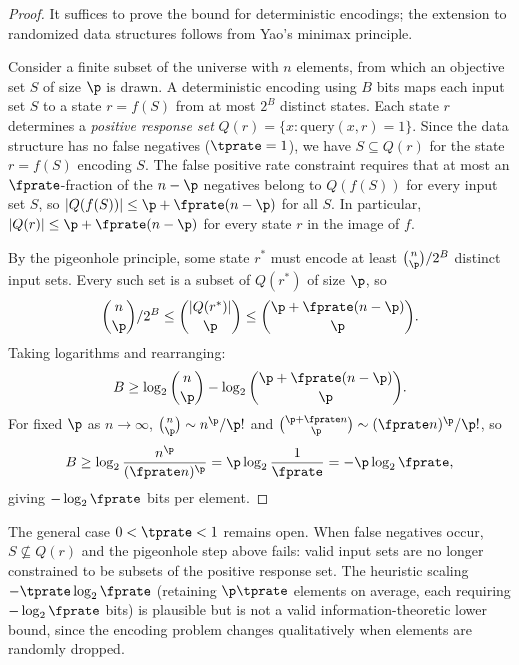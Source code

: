 \begin{proof}
It suffices to prove the bound for deterministic encodings; the extension to randomized data structures follows from Yao's minimax principle.

Consider a finite subset of the universe with $n$ elements, from which an
objective set $S$ of size $\p$ is drawn.
A deterministic encoding using $B$ bits maps each input set $S$ to a state
$r = f(S)$ from at most $2^B$ distinct states.
Each state $r$ determines a \emph{positive response set}
$Q(r) = \{x : \text{query}(x,r) = 1\}$.
Since the data structure has no false negatives ($\tprate = 1$), we have
$S \subseteq Q(r)$ for the state $r = f(S)$ encoding $S$.
The false positive rate constraint requires that at most an $\fprate$-fraction of the $n - \p$ negatives belong to $Q(f(S))$ for every input set $S$, so
$|Q(f(S))| \leq \p + \fprate(n - \p)$ for all $S$.
In particular, $|Q(r)| \leq \p + \fprate(n - \p)$ for every state $r$ in the image of $f$.

By the pigeonhole principle, some state $r^*$ must encode at least
$\binom{n}{\p} / 2^B$ distinct input sets.
Every such set is a subset of $Q(r^*)$ of size $\p$, so
\begin{equation}
\binom{n}{\p} / 2^B
    \leq \binom{|Q(r^*)|}{\p}
    \leq \binom{\p + \fprate(n - \p)}{\p}.
\end{equation}
Taking logarithms and rearranging:
\begin{equation}
B \geq \log_2 \binom{n}{\p} - \log_2 \binom{\p + \fprate(n - \p)}{\p}.
\end{equation}
For fixed $\p$ as $n \to \infty$, $\binom{n}{\p} \sim n^\p / \p!$ and
$\binom{\p + \fprate n}{\p} \sim (\fprate n)^\p / \p!$, so
\begin{equation}
B \geq \log_2 \frac{n^\p}{(\fprate n)^\p}
    = \p \log_2 \frac{1}{\fprate}
    = -\p \log_2 \fprate,
\end{equation}
giving $-\log_2 \fprate$ bits per element.
\end{proof}
\begin{remark}
\label{rem:general_lower_bound}
The general case $0 < \tprate < 1$ remains open.
When false negatives occur, $S \not\subseteq Q(r)$ and the pigeonhole step
above fails: valid input sets are no longer constrained to be subsets of the
positive response set.
The heuristic scaling $-\tprate \log_2 \fprate$ (retaining $\p \tprate$
elements on average, each requiring $-\log_2 \fprate$ bits) is plausible
but is not a valid information-theoretic lower bound, since the encoding
problem changes qualitatively when elements are randomly dropped.
\end{remark}

